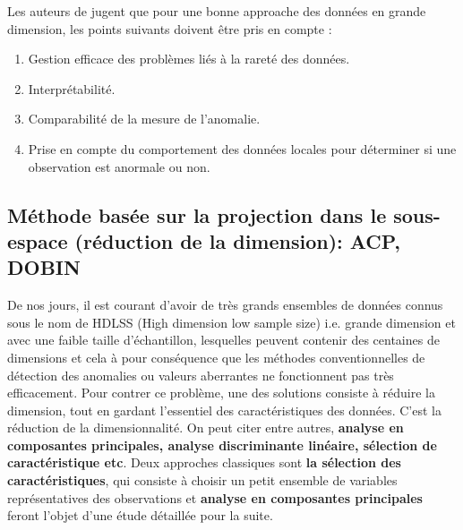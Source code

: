 \noindent Les auteurs de \cite{AYU} jugent que pour une bonne approache des données en grande dimension, les points suivants doivent être pris en compte \cite{Aurore} :
\begin{enumerate}[noitemsep]
\item Gestion efficace des problèmes liés à la rareté des données.
\item Interprétabilité.
\item Comparabilité de la mesure de l'anomalie. 
\item Prise en compte du comportement des données locales pour déterminer si une observation est anormale ou non.
\end{enumerate}
%

%
\subsection{Méthode basée sur la projection dans le sous-espace (réduction de la dimension): ACP, DOBIN}
%
De nos jours, il est courant d'avoir de très grands ensembles de données connus sous le nom de HDLSS (High dimension low sample size) i.e. grande dimension et avec une faible taille d’échantillon, lesquelles peuvent contenir des centaines de dimensions et cela à pour conséquence  que les méthodes conventionnelles de  détection des anomalies ou valeurs aberrantes ne fonctionnent pas très efficacement. Pour contrer ce problème, une des solutions consiste à réduire la dimension, tout en gardant l'essentiel des caractéristiques des données. C'est la réduction de la dimensionnalité. On peut citer entre autres,\textbf{ analyse en composantes principales,  analyse discriminante linéaire, sélection de caractéristique etc}. Deux approches classiques sont \textbf{la sélection des caractéristiques}, qui consiste à choisir un petit ensemble de variables représentatives des observations et \textbf{analyse en composantes principales} feront l'objet d'une étude détaillée pour la suite.
%
